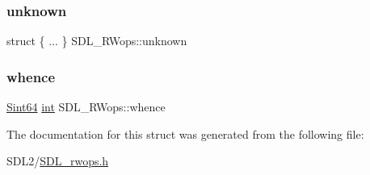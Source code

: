 \mbox{\label{struct_s_d_l___r_wops_a731b73efaba3d5bdc1209ac9c01297a2}} 
\subsubsection{\texorpdfstring{unknown}{unknown}}
{\footnotesize\ttfamily struct \{ ... \}   S\+D\+L\+\_\+\+R\+Wops\+::unknown}

\mbox{\label{struct_s_d_l___r_wops_a95b96dcc6690897bfaf2d059f4378ed2}} 
\subsubsection{\texorpdfstring{whence}{whence}}
{\footnotesize\ttfamily \hyperlink{_s_d_l__stdinc_8h_a2c1a61d5c466bb74680be0a8cc1b455d}{Sint64} \hyperlink{struct_s_d_l___r_wops_ab303bcbb0f6742a141ba8b2998923f47}{int} S\+D\+L\+\_\+\+R\+Wops\+::whence}



The documentation for this struct was generated from the following file\+:\begin{DoxyCompactItemize}
\item 
S\+D\+L2/\hyperlink{_s_d_l__rwops_8h}{S\+D\+L\+\_\+rwops.\+h}\end{DoxyCompactItemize}

